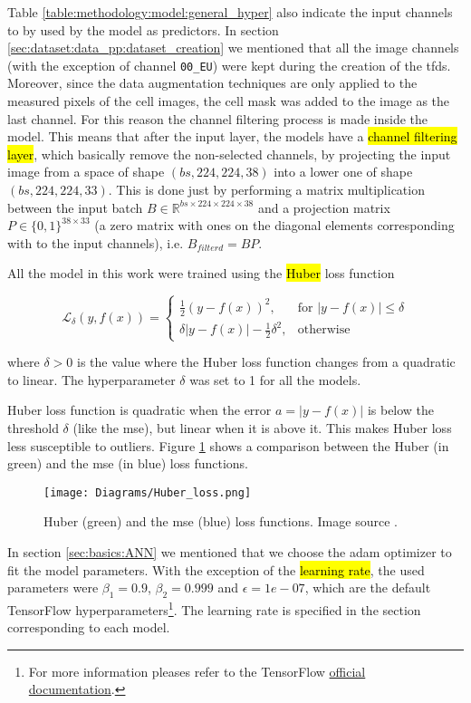 Table \ref{table:methodology:model:general_hyper} also indicate the input channels to by used by the model as predictors.
In section \ref{sec:dataset:data_pp:dataset_creation} we mentioned that all the image channels (with the exception of channel \texttt{00\_EU}) were kept during the creation of the \gls{tfds}.
Moreover, since the data augmentation techniques are only applied to the measured pixels of the cell images, the cell mask was added to the image as the last channel.
For this reason the channel filtering process is made inside the model.
This means that after the input layer, the models have a \hl{channel filtering layer}, which basically remove the non-selected channels, by projecting the input image from a space of shape $(bs, 224, 224, 38)$ into a lower one of shape $(bs, 224, 224, 33)$.
This is done just by performing a matrix multiplication between the input batch $B \in \mathbb{R}^{bs \times 224 \times 224 \times 38}$ and a projection matrix $P \in \{0,1\}^{38 \times 33}$ (a zero matrix with ones on the diagonal elements corresponding with to the input channels), i.e. $B_{filterd}=BP$.

All the model in this work were trained using the \hl{Huber} loss function

\begin{equation}
  \mathcal{L}_{\delta}(y,f(x)) =
    \begin{cases}
      \frac{1}{2}(y - f(x))^2, & \text{for } |y-f(x)|\leq \delta \\
      \delta |y-f(x)| - \frac{1}{2} \delta^2, & \text{otherwise}
    \end{cases}
\end{equation}

\noindent where $\delta>0$ is the value where the Huber loss function changes from a quadratic to linear. The hyperparameter $\delta$ was set to 1 for all the models.

Huber loss function is quadratic when the error $a=|y - f(x)|$ is below the threshold $\delta$ (like the \gls{mse}), but linear when it is above it. This makes Huber loss less susceptible to outliers. Figure \ref{fig:meth:huber_plot} shows a comparison between the Huber (in green) and the \gls{mse} (in blue) loss functions.

\begin{figure}[!ht]
  \centering
  \texttt{[image: Diagrams/Huber\_loss.png]}
  \caption{Huber (green) and the \gls{mse} (blue) loss functions. Image source \cite{huberplot}.}
  \label{fig:meth:huber_plot}
\end{figure}

In section \ref{sec:basics:ANN} we mentioned that we choose the \gls{adam} optimizer to fit the model parameters. With the exception of the \hl{learning rate}, the used parameters were $\beta_1=0.9$, $\beta_2=0.999$ and $\epsilon=1e-07$, which are the default TensorFlow hyperparameters\footnote{For more information pleases refer to the TensorFlow \href{https://www.tensorflow.org/api_docs/python/tf/keras/optimizers/Adam}{official documentation}.}. The learning rate is specified in the section corresponding to each model.
